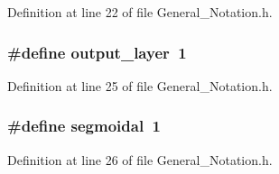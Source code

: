 Definition at line 22 of file General\-\_\-\-Notation.\-h.

\hypertarget{a00008_a64e47a8f29d1c6cc62edf670a753accc}{
\subsubsection[{output\-\_\-layer}]{\setlength{\rightskip}{0pt plus 5cm}\#define output\-\_\-layer~1}}\label{d4/dee/a00008_a64e47a8f29d1c6cc62edf670a753accc}


Definition at line 25 of file General\-\_\-\-Notation.\-h.

\hypertarget{a00008_a2f65cc4d2a528ee38224d709c1d73015}{
\subsubsection[{segmoidal}]{\setlength{\rightskip}{0pt plus 5cm}\#define segmoidal~1}}\label{d4/dee/a00008_a2f65cc4d2a528ee38224d709c1d73015}


Definition at line 26 of file General\-\_\-\-Notation.\-h.

